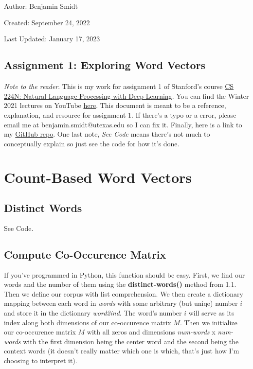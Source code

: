 \documentclass[12pt]{article}
\begin{document}
\noindent Author: Benjamin Smidt

\noindent Created: September 24, 2022

\noindent Last Updated: January 17, 2023
\begin{center}
\section*{Assignment 1: Exploring Word Vectors}
\end{center}

\paragraph{} \emph{Note to the reader}. This is my work for assignment 1 of Stanford's course
\href{https://web.stanford.edu/class/cs224n/}{CS 224N: Natural Language Processing with Deep Learning}. 
You can find the Winter 2021 lectures on YouTube \href{https://www.youtube.com/playlist?list=PLoROMvodv4rOSH4v6133s9LFPRHjEmbmJ}{here}.
This document is meant to be a reference, explanation, and resource for assignment 1. 
If there's a typo or a error, please email me at benjamin.smidt@utexas.edu so I can fix it. 
Finally, here is a link to my \href{https://github.com/bensmidt/CS224N-DL-NLP}{GitHub repo}. One last note, \emph{See Code} means there's not much 
to conceptually explain so just see the code for how it's done.

\tableofcontents

\newpage

\section{Count-Based Word Vectors}

\subsection{Distinct Words}
See Code.

\subsection{Compute Co-Occurence Matrix}
If you've programmed in Python, this function should be easy. First, we find our 
words and the number of them using the \textbf{distinct-words()} method from 1.1. Then we 
define our corpus with list comprehension. We then create a dictionary mapping between 
each word in \emph{words} with some arbitrary (but uniqe) number $i$ and store it in the dictionary \emph{word2ind}. The word's 
number $i$ will serve as its index along both dimensions of our co-occurence matrix $M$. Then we 
initialize our co-occurence matrix $M$ with all zeros and dimensions \emph{num-words} x \emph{num-words} with the 
first dimension being the center word and the second being the context words (it doesn't really matter which
one is which, that's just how I'm choosing to interpret it).
\end{document}

